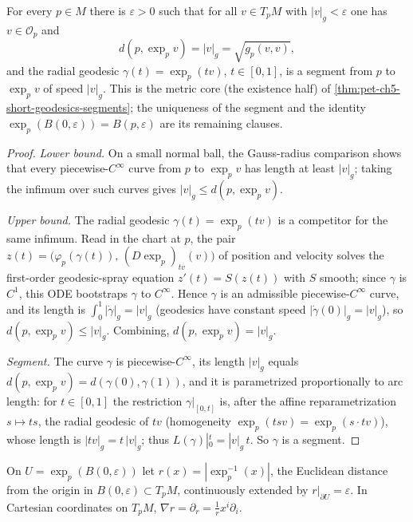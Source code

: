 \begin{lemma}
  \label{lem:pet-ch5-radial-geodesic-segment}
  \leanok
  For every $p\in M$ there is $\varepsilon>0$ such that for all $v\in T_pM$ with
  $|v|_g<\varepsilon$ one has $v\in\mathcal O_p$ and
  \[
    d(p,\exp_p v)=|v|_g=\sqrt{g_p(v,v)},
  \]
  and the radial geodesic $\gamma(t)=\exp_p(tv)$, $t\in[0,1]$, is a segment from
  $p$ to $\exp_p v$ of speed $|v|_g$. This is the metric core (the existence half)
  of \cref{thm:pet-ch5-short-geodesics-segments}; the uniqueness of the segment and
  the identity $\exp_p(B(0,\varepsilon))=B(p,\varepsilon)$ are its remaining
  clauses.
\end{lemma}
\begin{proof}
  \leanok
  \emph{Lower bound.} On a small normal ball, the Gauss-radius comparison shows
  that every piecewise-$C^\infty$ curve from $p$ to $\exp_p v$ has length at least
  $|v|_g$; taking the infimum over such curves gives $|v|_g\le d(p,\exp_p v)$.

  \emph{Upper bound.} The radial geodesic $\gamma(t)=\exp_p(tv)$ is a competitor
  for the same infimum. Read in the chart at $p$, the pair
  $z(t)=\bigl(\varphi_p(\gamma(t)),\,(D\exp_p)_{tv}(v)\bigr)$ of position and
  velocity solves the first-order geodesic-spray equation $z'(t)=S(z(t))$ with
  $S$ smooth; since $\gamma$ is $C^1$, this ODE bootstraps $\gamma$ to
  $C^\infty$. Hence $\gamma$ is an admissible piecewise-$C^\infty$ curve, and its
  length is $\int_0^1|\dot\gamma|_g=|v|_g$ (geodesics have constant speed
  $|\dot\gamma(0)|_g=|v|_g$), so $d(p,\exp_p v)\le|v|_g$. Combining,
  $d(p,\exp_p v)=|v|_g$.

  \emph{Segment.} The curve $\gamma$ is piecewise-$C^\infty$, its length $|v|_g$
  equals $d(p,\exp_p v)=d(\gamma(0),\gamma(1))$, and it is parametrized
  proportionally to arc length: for $t\in[0,1]$ the restriction $\gamma|_{[0,t]}$
  is, after the affine reparametrization $s\mapsto ts$, the radial geodesic of
  $tv$ (homogeneity $\exp_p(tsv)=\exp_p(s\cdot tv)$), whose length is
  $|tv|_g=t\,|v|_g$; thus $L(\gamma)|_0^t=|v|_g\,t$. So $\gamma$ is a segment.
\end{proof}

\begin{definition}
  \label{def:pet-ch5-radial-distance-function}
  On $U=\exp_p(B(0,\varepsilon))$ let $r(x)=|\exp_p^{-1}(x)|$, the Euclidean
  distance from the origin in $B(0,\varepsilon)\subset T_pM$, continuously extended
  by $r|_{\partial U}=\varepsilon$. In Cartesian coordinates on $T_pM$,
  $\nabla r=\partial_r=\tfrac1rx^i\partial_i$.
\end{definition}

